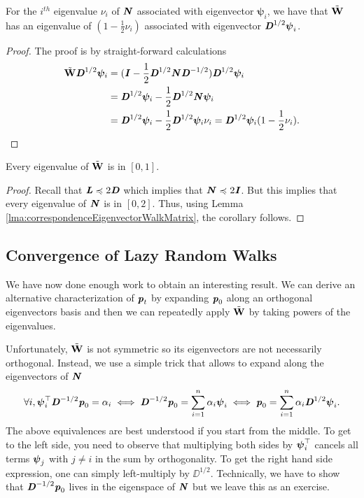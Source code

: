 \begin{lemma}\label{lma:correspondenceEigenvectorWalkMatrix}
For the $i^{th}$ eigenvalue $\nu_i$ of $\boldsymbol{\mathit{N}}$ associated with eigenvector $\bm{\psi}_i$, we have that ${\tilde{\mathbf{W}}}$ has an eigenvalue of $(1 - \frac{1}{2}\nu_i)$ associated with eigenvector $\boldsymbol{\mathit{D}}^{1/2} \boldsymbol{\mathit{\psi}}_i$.
\end{lemma}
\begin{proof}
The proof is by straight-forward calculations
\begin{align*}
    {\tilde{\mathbf{W}}} \boldsymbol{\mathit{D}}^{1/2} \bm{\psi}_i &= (\boldsymbol{\mathit{I}} - \frac{1}{2} \boldsymbol{\mathit{D}}^{1/2}\boldsymbol{\mathit{N}} \boldsymbol{\mathit{D}}^{-1/2})\boldsymbol{\mathit{D}}^{1/2} \bm{\psi}_i \\ &= \boldsymbol{\mathit{D}}^{1/2} \bm{\psi}_i - \frac{1}{2} \boldsymbol{\mathit{D}}^{1/2}\boldsymbol{\mathit{N}} \bm{\psi}_i \\
    &=\boldsymbol{\mathit{D}}^{1/2} \bm{\psi}_i - \frac{1}{2} \boldsymbol{\mathit{D}}^{1/2}\bm{\psi}_i \nu_i = \boldsymbol{\mathit{D}}^{1/2} \bm{\psi}_i (1 - \frac{1}{2}\nu_i).
\end{align*}
\end{proof}

\begin{corollary}
Every eigenvalue of ${\tilde{\mathbf{W}}}$ is in $[0,1]$.
\end{corollary}
\begin{proof}
Recall that $\boldsymbol{\mathit{L}} \preccurlyeq 2\boldsymbol{\mathit{D}}$ which implies that $\boldsymbol{\mathit{N}} \preccurlyeq 2 \boldsymbol{\mathit{I}}$. But this implies that every eigenvalue of $\boldsymbol{\mathit{N}}$ is in $[0,2]$. Thus, using Lemma \ref{lma:correspondenceEigenvectorWalkMatrix}, the corollary follows.
\end{proof}

\subsection{Convergence of Lazy Random Walks}

We have now done enough work to obtain an interesting result. We can derive an alternative characterization of $\boldsymbol{\mathit{p}}_t$ by expanding $\boldsymbol{\mathit{p}}_0$ along an orthogonal eigenvectors basis and then we can repeatedly apply ${\tilde{\mathbf{W}}}$ by taking powers of the eigenvalues. 

Unfortunately, ${\tilde{\mathbf{W}}}$ is not symmetric so its eigenvectors are not necessarily orthogonal. Instead, we use a simple trick that allows to expand along the eigenvectors of $\boldsymbol{\mathit{N}}$
\begin{align}\label{eq:definitionOfAlphaForWalks}
     \forall i, \boldsymbol{\mathit{\psi}}_i^{\top} \boldsymbol{\mathit{D}}^{-1/2} \boldsymbol{\mathit{p}}_0 = \alpha_i \iff \boldsymbol{\mathit{D}}^{-1/2} \boldsymbol{\mathit{p}}_0 = \sum_{i=1}^n \alpha_i \boldsymbol{\mathit{\psi}}_i \iff  \boldsymbol{\mathit{p}}_0 = \sum_{i=1}^n \alpha_i \boldsymbol{\mathit{D}}^{1/2} \boldsymbol{\mathit{\psi}}_i.
\end{align}
The above equivalences are best understood if you start from the middle. To get to the left side, you need to observe that multiplying both sides by $\boldsymbol{\mathit{\psi}}_i^{\top}$ cancels all terms $\boldsymbol{\mathit{\psi}}_j$ with $j \neq i$ in the sum by orthogonality. To get the right hand side expression, one can simply left-multiply by $\DD^{1/2}$. Technically, we have to show that $\boldsymbol{\mathit{D}}^{-1/2}\boldsymbol{\mathit{p}}_0$ lives in the eigenspace of $\boldsymbol{\mathit{N}}$ but we leave this as an exercise.

